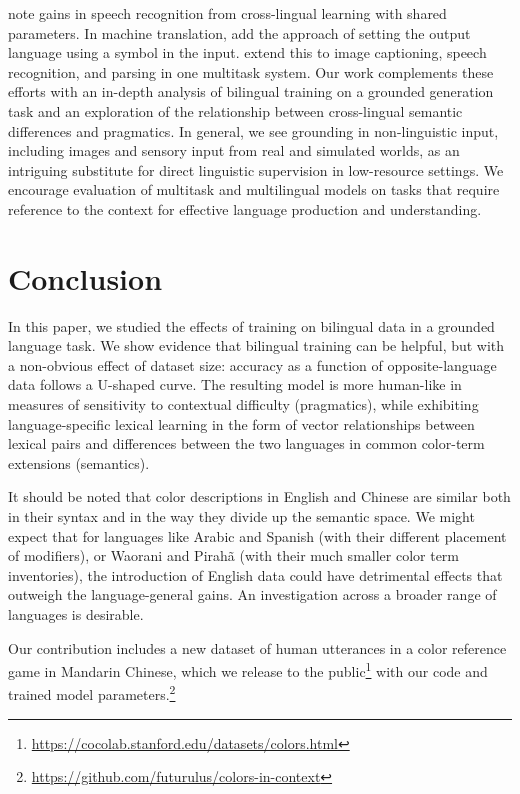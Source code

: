 \documentclass[11pt,a4paper]{article}
\renewcommand{\|}{\mid}
\begin{document}
\citet{Huang2013} note gains in speech recognition from cross-lingual learning with shared parameters. In machine translation,
\citet{Johnson2016} add the approach of setting the output language using a symbol in the input. 
\citet{Kaiser2017} extend this to image captioning, speech recognition, and parsing in one multitask system.
Our work complements these efforts with an in-depth analysis of bilingual training on a 
grounded generation task and an exploration of the relationship between cross-lingual semantic differences 
and pragmatics. In general, we see grounding in non-linguistic input, including
images and sensory input from real and simulated worlds, as an intriguing
substitute for direct linguistic supervision in low-resource settings. We encourage
evaluation of multitask and multilingual models on tasks that require reference to 
the context for effective language production and understanding.

\section{Conclusion}

In this paper, we studied the effects of training on bilingual data in a grounded language task. We show evidence that
bilingual training can be helpful, but with a non-obvious effect of dataset size: accuracy as a function of opposite-language
data follows a U-shaped curve. The resulting model is more human-like in measures of sensitivity to contextual difficulty (pragmatics), while
exhibiting language-specific lexical learning in the form of vector relationships between lexical pairs
and differences between the two languages in common color-term extensions
(semantics).

It should be noted that color descriptions in English and Chinese are similar both in their syntax
and in the way they divide up the semantic space. We might expect that for languages like Arabic and Spanish (with their
different placement of modifiers), or Waorani and Pirah\~a (with their much smaller color term
inventories), the introduction of English data could have detrimental effects that 
outweigh the language-general gains. An investigation across a broader range of languages is desirable.

Our contribution includes a new dataset of human utterances in a color reference game in Mandarin Chinese, which we
release to the public\footnote{\url{https://cocolab.stanford.edu/datasets/colors.html}} with our code and trained model
parameters.\footnote{\url{https://github.com/futurulus/colors-in-context}}
\end{document}
